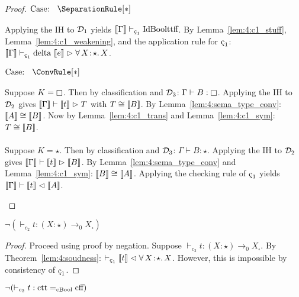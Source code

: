 \begin{proof}
    $\text{Case: }\begin{array}{c} \SeparationRule[*] \end{array}$
    \begin{proofcase}
        Applying the IH to $\mathcal{D}_{1}$ yields $\sema{\Gamma} \vdash_{\oldced} \cId \cBool \ctt \cff$.
        By Lemma~\ref{lem:4:c1_stuff}, Lemma~\ref{lem:4:c1_weakening}, and the application rule for $\oldced$:
            $\sema{\Gamma} \vdash_{\oldced} \cdelta\ \sema{e} \infr \abs{\forall}{X}{\star}{X}$.
    \end{proofcase}

    $\text{Case: }\begin{array}{c} \ConvRule[*] \end{array}$
    \begin{proofcase}
        Suppose $K = \kind$.
        Then by classification and $\mathcal{D}_{3}$: $\Gamma \vdash B : \kind$.
        Applying the IH to $\mathcal{D}_{2}$ gives $\llbracket \Gamma \rrbracket \vdash \llbracket t \rrbracket \vartriangleright T$ with $T \cong \llbracket B \rrbracket$.
        By Lemma~\ref{lem:4:sema_type_conv}: $\llbracket A \rrbracket \cong \llbracket B \rrbracket$.
        Now by Lemma~\ref{lem:4:c1_trans} and Lemma~\ref{lem:4:c1_sym}: $T \cong \llbracket B \rrbracket$.
        \\ \\
        Suppose $K = \star$.
        Then by classification and $\mathcal{D}_{3}$: $\Gamma \vdash B : \star$.
        Applying the IH to $\mathcal{D}_{2}$ gives $\llbracket \Gamma \rrbracket \vdash \llbracket t \rrbracket \vartriangleright \llbracket B \rrbracket$.
        By Lemma~\ref{lem:4:sema_type_conv} and Lemma~\ref{lem:4:c1_sym}: $\llbracket B \rrbracket \cong \llbracket A \rrbracket$.
        Applying the checking rule of $\oldced$ yields $\llbracket \Gamma \rrbracket \vdash \llbracket t \rrbracket \vartriangleleft \llbracket A \rrbracket$.
    \end{proofcase}
\end{proof}

\begin{theorem}
    \label{lem:4:logical_consistency}
    $\neg (\vdash_{c_2} t : (X : \star) \to_0 X_\square)$
\end{theorem}
\begin{proof}
    Proceed using proof by negation.
    Suppose $\vdash_{c_2} t : (X : \star) \to_0 X_\square$.
    By Theorem~\ref{lem:4:soudness}: $\vdash_{\oldced} \sema{t} \chck \abs{\forall}{X}{\star}{X}$.
    However, this is impossible by consistency of $\oldced$.
\end{proof}

\begin{corollary}
    \label{lem:4:eq_consistency}
    $\neg (\vdash_{c_2} t : \textnormal{ctt} =_{\textnormal{cBool}} \textnormal{cff})$
\end{corollary}
